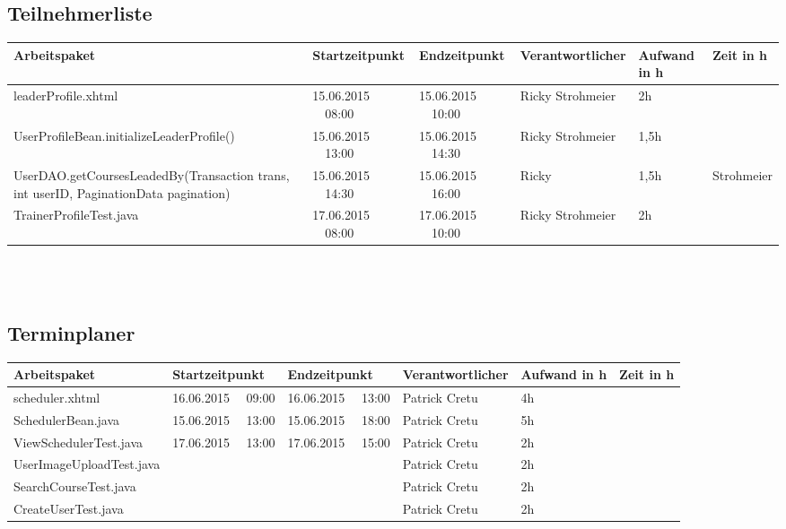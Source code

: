 \begin{landscape}
	\subsection{Teilnehmerliste}
	\begin{tabular}{|p{10.3cm}|p{3.2cm}|p{3.2cm}|p{3.5cm}|p{1.7cm}|p{1.5cm}|}
		\hline  \textbf{Arbeitspaket} & \textbf{Startzeitpunkt} & \textbf{Endzeitpunkt} & \textbf{Verantwortlicher}  & \textbf{Aufwand in h} & \textbf{Zeit in h}\\
		\hline   leaderProfile.xhtml                      & 15.06.2015 \ \ 08:00        & 15.06.2015 \ \ 10:00        & Ricky Strohmeier &  2h                 &\\
		\hline   UserProfileBean.initializeLeaderProfile()& 15.06.2015 \ \ 13:00        & 15.06.2015 \ \ 14:30        & Ricky Strohmeier &  1,5h                 &\\
		\hline   UserDAO.getCoursesLeadedBy(Transaction trans, int userID, PaginationData pagination)  & 15.06.2015 \ \ 14:30        & 15.06.2015 \ \ 16:00   &  Ricky &  1,5h                 & Strohmeier\\
		\hline   TrainerProfileTest.java  & 17.06.2015 \ \ 08:00        & 17.06.2015 \ \ 10:00        & Ricky Strohmeier &  2h                 &\\
		\hline 
	\end{tabular} \ \\
	\ \\
	
	\subsection{Terminplaner}
	\begin{tabular}{|p{10.3cm}|p{3.2cm}|p{3.2cm}|p{3.5cm}|p{1.7cm}|p{1.5cm}|}
		\hline  \textbf{Arbeitspaket} & \textbf{Startzeitpunkt} & \textbf{Endzeitpunkt} & \textbf{Verantwortlicher}  & \textbf{Aufwand in h} & \textbf{Zeit in h}\\
		\hline   scheduler.xhtml                                 & 16.06.2015 \ \ 09:00        & 16.06.2015 \ \ 13:00       & Patrick Cretu  &  4h  &    \\ 
		\hline   SchedulerBean.java                              & 15.06.2015 \ \ 13:00        & 15.06.2015 \ \ 18:00       & Patrick Cretu  &  5h  &    \\ 
		\hline   ViewSchedulerTest.java                          & 17.06.2015 \ \ 13:00 & 17.06.2015 \ \ 15:00              & Patrick Cretu  &  2h  &    \\
		\hline   UserImageUploadTest.java                        &                      &                                   & Patrick Cretu  &  2h  &    \\
		\hline   SearchCourseTest.java                           &                      &                                   & Patrick Cretu  &  2h  &    \\
		\hline   CreateUserTest.java                             &                      &                                   & Patrick Cretu  &  2h  &    \\
		\hline 
	\end{tabular} \ \\
	\ \\
	

\end{landscape}
